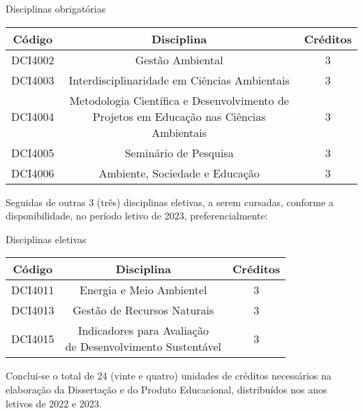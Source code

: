 \documentclass[
  12pt,       %
  openright,      %
  twoside,      %
  a4paper,      %
  english,      %
  french,       %
  spanish,      %
  brazil        %
  ]{abntex2}
\begin{document}
\begin{quadro}
\caption{\label{Disciplinas obrigatórias}Disciplinas obrigatórias}
\begin{tabular}{|c|c|c|}
  \hline
  \textbf{Código} & \textbf{Disciplina} & \textbf{Créditos} \\ \hline
  DCI4002 & Gestão Ambiental & 3   \\ \hline
  DCI4003 & Interdisciplinaridade em Ciências Ambientais & 3   \\ \hline
  DCI4004 & \makecell{Metodologia Científica e Desenvolvimento de \\
            Projetos em Educação nas Ciências Ambientais}   & 3  \\ \hline
  DCI4005 & Seminário de Pesquisa    & 3   \\ \hline
  DCI4006 & Ambiente, Sociedade e Educação & 3   \\ \hline
\end{tabular}
\end{quadro}


Seguidas de outras 3 (três) disciplinas eletivas, a serem cursadas, conforme a disponibilidade, no período letivo de 2023, preferencialmente:


\begin{quadro}
\caption{\label{Disciplinas eletivas}Disciplinas eletivas}
\begin{tabular}{|c|c|c|}
  \hline
  \textbf{Código} & \textbf{Disciplina} & \textbf{Créditos} \\ \hline
  DCI4011 & Energia e Meio Ambientel & 3   \\ \hline
  DCI4013 & Gestão de Recursos Naturais & 3   \\ \hline
  DCI4015 & \makecell{Indicadores para Avaliação\\ de Desenvolvimento Sustentável}   & 3  \\ \hline
\end{tabular}
\end{quadro}

Conclui-se o total de 24 (vinte e quatro) unidades de créditos necessários na elaboração da Dissertação e do Produto Educacional, distribuídos nos anos letivos de 2022 e 2023.









\postextual


\end{document}
